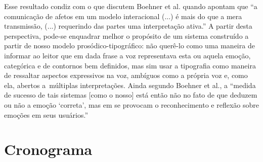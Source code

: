 \documentclass[a4paper]{tufte-handout}
\begin{document}
Esse resultado condiz com o que discutem Boehner et al. quando apontam que ``a comunicação de afetos em um modelo interacional (...) é mais do que a mera transmissão, (...) requerindo das partes uma interpretação ativa.''  A partir desta perspectiva, pode-se enquadrar melhor o propósito de um sistema construído a partir de nosso modelo prosódico-tipográfico: não querê-lo como uma maneira de informar ao leitor que em dada frase a voz representava esta ou aquela emoção, categórica e de contornos bem definidos, mas sim usar a tipografia como maneira de ressaltar aspectos expressivos na voz, ambíguos como a própria voz e, como ela, abertos a~múltiplas interpretações. Ainda segundo Boehner et al., a ``medida de sucesso de tais sistemas [como o nosso] está então não no fato de que deduzem ou não a emoção `correta', mas em se provocam o reconhecimento e reflexão sobre emoções em seus usuários.'' 


\pagebreak

\section{Cronograma}\label{sec:plano_de_trabalho}
\end{document}
